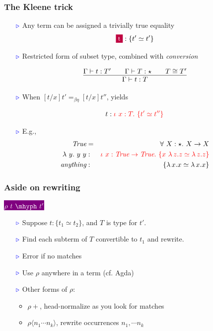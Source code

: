 \documentclass[11pt]{beamer}
\newcommand{\myb}[0]{\ensuremath{\textcolor{blue}{\triangleright}}}
\begin{document}
\begin{frame}
  \frametitle{The Kleene trick}

  \begin{itemize}
  \item[$\myb$] Any term can be assigned a trivially true equality
\[
    \colorbox{purple}{\textcolor{white}{t}} : \{ t' \simeq t'\}
\]

  \item[$\myb$] Restricted form of subset type,  combined with \emph{conversion}

    \[
    \infer{\Gamma\vdash t : T}{\Gamma \vdash t:T' \qquad \Gamma \vdash T : \star \qquad T \cong T'}
    \]

  \item[$\myb$] When $[t/x]t' =_{\beta\eta} [t/x]t''$, yields

    \[
    t : {\color{red}\iota\ x : T.\ \{ t' \simeq t'' \}}
    \]

  \item[$\myb$] E.g.,
    \begin{eqnarray*}
      \textit{True} & = & \forall\ X : \star.\ X \to X \\
      \lambda\ y.\ y\ y & : & {\color{red}\iota\ x : \textit{True} \to \textit{True}.\ \{ x\ \lambda\, z.z \simeq \lambda\, z.z \}} \\ 
      \textit{anything} & : & \{ \lambda\, x.x \simeq \lambda\, x.x \}
    \end{eqnarray*}
    

  \end{itemize}
\end{frame}

\begin{frame}
  \frametitle{Aside on rewriting}

  \begin{center}
    \huge
    \colorbox{purple}{$\color{white}\rho\ t\ \mhyph\ t'$}
  \end{center}

  \begin{itemize}
    \item[$\myb$]  Suppose $t : \{ t_1 \simeq t_2 \}$, and $T$ is type for $t'$.

    \item[$\myb$]  Find each subterm of $T$ convertible to $t_1$ and rewrite.
    \item[$\myb$] Error if no matches
    \item[$\myb$] Use $\rho$ anywhere in a term (cf. Agda)
    \item[$\myb$] Other forms of $\rho$:
      \begin{itemize}
      \item $\rho+$, head-normalize as you look for matches
      \item $\rho\langle n_1 \cdots n_k \rangle$, rewrite occurrences $n_1,\cdots n_k$
      \end{itemize}
  \end{itemize}
\end{frame}
\end{document}
